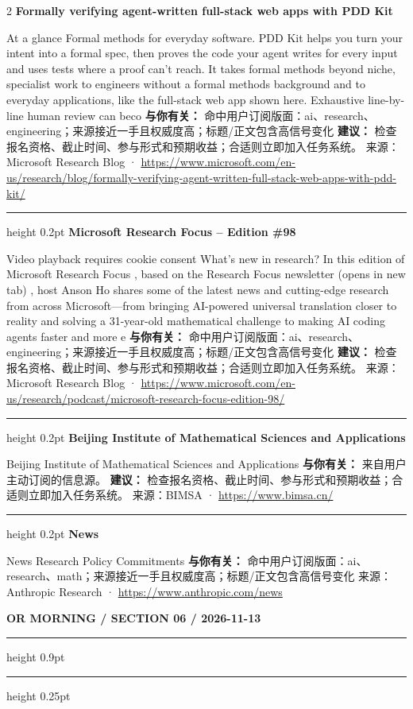 \documentclass[10.5pt]{ctexart}
\begin{document}
\begin{multicols}{2}
{\large\bfseries Formally verifying agent-written full-stack web apps with PDD Kit}\par
At a glance Formal methods for everyday software. PDD Kit helps you turn your intent into a formal spec, then proves the code your agent writes for every input and uses tests where a proof can’t reach. It takes formal methods beyond niche, specialist work to engineers without a formal methods background and to everyday applications, like the full-stack web app shown here. Exhaustive line-by-line human review can beco
\textbf{与你有关：} 命中用户订阅版面：ai、research、engineering；来源接近一手且权威度高；标题/正文包含高信号变化
\textbf{建议：} 检查报名资格、截止时间、参与形式和预期收益；合适则立即加入任务系统。
{\footnotesize\color{ormuted} 来源：Microsoft Research Blog · \url{https://www.microsoft.com/en-us/research/blog/formally-verifying-agent-written-full-stack-web-apps-with-pdd-kit/}}
\vspace{2mm}
\hrule height 0.2pt
\vspace{2mm}
{\large\bfseries Microsoft Research Focus – Edition \#98}\par
Video playback requires cookie consent What’s new in research? In this edition of Microsoft Research Focus , based on the Research Focus newsletter (opens in new tab) , host Anson Ho shares some of the latest news and cutting-edge research from across Microsoft—from bringing AI-powered universal translation closer to reality and solving a 31-year-old mathematical challenge to making AI coding agents faster and more e
\textbf{与你有关：} 命中用户订阅版面：ai、research、engineering；来源接近一手且权威度高；标题/正文包含高信号变化
\textbf{建议：} 检查报名资格、截止时间、参与形式和预期收益；合适则立即加入任务系统。
{\footnotesize\color{ormuted} 来源：Microsoft Research Blog · \url{https://www.microsoft.com/en-us/research/podcast/microsoft-research-focus-edition-98/}}
\vspace{2mm}
\hrule height 0.2pt
\vspace{2mm}
{\large\bfseries Beijing Institute of Mathematical Sciences and Applications}\par
Beijing Institute of Mathematical Sciences and Applications
\textbf{与你有关：} 来自用户主动订阅的信息源。
\textbf{建议：} 检查报名资格、截止时间、参与形式和预期收益；合适则立即加入任务系统。
{\footnotesize\color{ormuted} 来源：BIMSA · \url{https://www.bimsa.cn/}}
\vspace{2mm}
\hrule height 0.2pt
\vspace{2mm}
{\large\bfseries News}\par
News Research Policy Commitments
\textbf{与你有关：} 命中用户订阅版面：ai、research、math；来源接近一手且权威度高；标题/正文包含高信号变化
{\footnotesize\color{ormuted} 来源：Anthropic Research · \url{https://www.anthropic.com/news}}
\end{multicols}
\newpage
{\small\bfseries OR MORNING / SECTION 06 / 2026-11-13}
\vspace{2mm}
\hrule height 0.9pt
\vspace{1.5mm}
\hrule height 0.25pt
\vspace{4mm}
\end{document}

